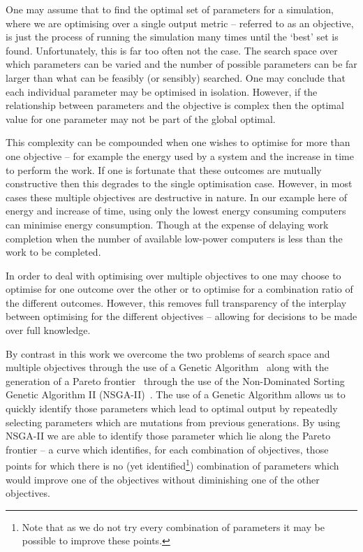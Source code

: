 \documentclass[10pt, conference, compsocconf]{IEEEtran}
\begin{document}
One may assume that to find the optimal set of parameters for a simulation, where we are optimising over a single output metric -- referred to as an objective, is just the process of running the simulation many times until the `best' set is found. Unfortunately, this is far too often not the case. The search space over which parameters can be varied and the number of possible parameters can be far larger than what can be feasibly (or sensibly) searched. One may conclude that each individual parameter may be optimised in isolation. However, if the relationship between parameters and the objective is complex then the optimal value for one parameter may not be part of the global optimal. 

This complexity can be compounded when one wishes to optimise for more than one objective -- for example the energy used by a system and the increase in time to perform the work. If one is fortunate that these outcomes are mutually constructive then this degrades to the single optimisation case. However, in most cases these multiple objectives are destructive in nature. In our example here of energy and increase of time, using only the lowest energy consuming computers can minimise energy consumption. Though at the expense of delaying work completion when the number of available low-power computers is less than the work to be completed.

In order to deal with optimising over multiple objectives to one may choose to optimise for one outcome over the other or to optimise for a combination ratio of the different outcomes. However, this removes full transparency of the interplay between optimising for the different objectives -- allowing for decisions to be made over full knowledge.

By contrast in this work we overcome the two problems of search space and multiple objectives through the use of a Genetic Algorithm~\cite{mitchell1995genetic} along with the generation of a Pareto frontier~\cite{Pareto1927, Stadler1979} through the use of the Non-Dominated Sorting Genetic Algorithm II (NSGA-II)~\cite{Valkanas2014}. The use of a Genetic Algorithm allows us to quickly identify those parameters which lead to optimal output by repeatedly selecting parameters which are mutations from previous generations. By using NSGA-II	 we are able to identify those parameter which lie along the Pareto frontier -- a curve which identifies, for each combination of objectives, those points for which there is no (yet identified\footnote{Note that as we do not try every combination of parameters it may be possible to improve these points.}) combination of parameters which would improve one of the objectives without diminishing one of the other objectives.
\end{document}
